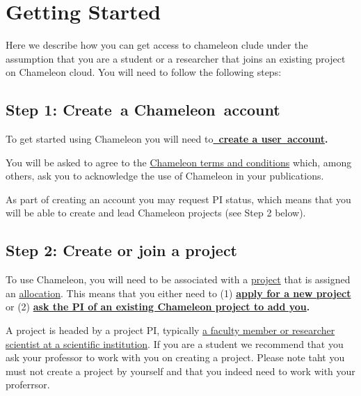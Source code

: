 \FILENAME

\chapter{Getting Started}\label{getting-started}

Here we describe how you can get access to chameleon clude under the
assumption that you are a student or a researcher that joins an
existing project on Chameleon cloud. You will need to follow the
following steps:

\section{Step 1: Create~a Chameleon~account}\label{accounts}

To get started using Chameleon you will need
to\textbf{\href{https://www.chameleoncloud.org/register}{~create a
user~account}.}

You will be asked to agree to the
\href{https://www.chameleoncloud.org/terms/view/chameleon-user-terms/}{Chameleon
terms and conditions} which, among others, ask you to acknowledge the
use of Chameleon in your publications.

As part of creating an account you may request PI status, which means
that you will be able to create and lead Chameleon projects (see Step 2
below). 

\section{Step 2: Create or join a project}\label{allocations}

To use Chameleon, you will need to be associated with a
\href{https://www.chameleoncloud.org/docs/user-faq/\#toc-how-do-i-apply-for-a-chameleon-project-}{project}
that is assigned an
\href{https://www.chameleoncloud.org/docs/user-faq/\#toc-what-are-the-project-allocation-sizes-and-limits-}{allocation}.
This means that you either need to
(1) \textbf{\href{https://www.chameleoncloud.org/user/projects/new/}{apply
for a new project}} or (2)
\textbf{\href{https://www.chameleoncloud.org/docs/user-faq/\#toc-my-pi-professor-colleague-already-has-a-chameleon-project-how-do-i-get-added-as-a-user-on-the-project-}{ask
the PI of an existing Chameleon project to add you}.}

A project is headed by a project PI, typically
\href{https://www.chameleoncloud.org/docs/user-faq/\#toc-who-is-eligible-to-be-chameleon-pi-and-how-do-i-make-sure-that-my-pi-status-is-reflected-in-my-profile-}{a
faculty member or researcher scientist at a scientific institution}. If
you are a student we recommend that you ask your professor to work with
you on creating a project. Please note taht you must not create a
project by yourself and that you indeed need to work with your
proferrsor. 

